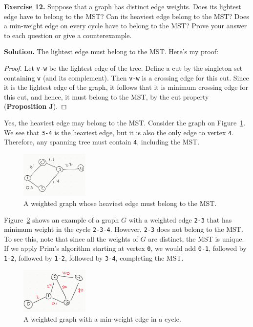 \documentclass[12pt, a4paper]{article}
\newenvironment{ex}[2][Exercise]
{\par\medskip\noindent \textbf{#1 #2.}}
{\medskip}
\newenvironment{sol}[1][Solution]
{\par\medskip\noindent \textbf{#1.} }
{\medskip}
\begin{document}
	\begin{ex}{12}
		Suppose that a graph has distinct edge weights. Does its lightest edge have to belong
		to the MST? Can its heaviest edge belong to the MST? Does a min-weight edge on
		every cycle have to belong to the MST? Prove your answer to each question or give
		a counterexample.
	\end{ex}
	\begin{sol}
		The lightest edge must belong to the MST. Here's my proof:
		\begin{proof}
			Let \texttt{v-w} be the lightest edge of the tree. Define a cut by
			the singleton set containing \texttt{v} (and its complement). Then
			\texttt{v-w} is a crossing edge for this cut. Since it is the lightest
			edge of the graph, it follows that it is minimum crossing edge for
			this cut, and hence, it must belong to the MST, by the cut property
			(\textbf{Proposition J}).
		\end{proof}
		Yes, the heaviest edge may belong to the MST. Consider the graph on
		Figure~\ref{fig:ex-12-heaviest-edge}. We see that \texttt{3-4} is the heaviest edge,
		but it is also the only edge to vertex \texttt{4}. Therefore, any spanning
		tree must contain \texttt{4}, including the MST.
		\begin{figure}
			\centering
			\includegraphics[width=0.3\textwidth]{exercise-12-heaviest-edge}
			\caption{A weighted graph whose heaviest edge must belong to the MST.}
			\label{fig:ex-12-heaviest-edge}
		\end{figure}
		
		Figure~\ref{fig:ex-12-cycle-counterexample} shows an example of a graph $G$
		with a weighted edge \texttt{2-3} that has minimum weight in the cycle
		\texttt{2-3-4}. However, \texttt{2-3} does not belong to the MST. To see this,
		note that since all the weights of $G$ are distinct, the MST is unique.
		If we apply Prim's algorithm starting at vertex \texttt{0}, we would add
		\texttt{0-1}, followed by \texttt{1-2}, followed by \texttt{1-2},
		followed by \texttt{3-4}, completing the MST.
		\begin{figure}
			\centering
			\includegraphics[width=0.3\textwidth]{exercise-12-cycle-lightest-edge-counter}
			\caption{A weighted graph with a min-weight edge in a cycle.}
			\label{fig:ex-12-cycle-counterexample}
		\end{figure}
	\end{sol}
\end{document}
